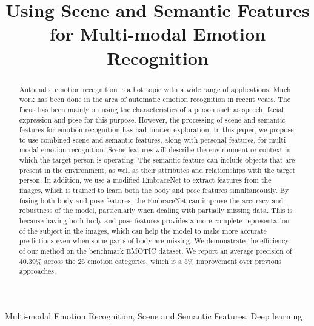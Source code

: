 \documentclass[conference]{IEEEtran}
\begin{document}
\title{Using Scene and Semantic Features for Multi-modal Emotion Recognition\\}

\author{
}
\maketitle

\begin{abstract}
Automatic emotion recognition is a hot topic with a wide range of applications. Much work has been done in the area of automatic emotion recognition in recent years. The focus has been mainly on using the characteristics of a person such as speech, facial expression and pose for this purpose. However, the processing of scene and semantic features for emotion recognition has had limited exploration. In this paper, we propose to use combined scene and semantic features, along with personal features, for multi-modal emotion recognition. Scene features will describe the environment or context in which the target person is operating. The semantic feature can include objects that are present in the environment, as well as their attributes and relationships with the target person. In addition, we use a modified EmbraceNet to extract features from the images, which is trained to learn both the body and pose features simultaneously. By fusing both body and pose features, the EmbraceNet can improve the accuracy and robustness of the model, particularly when dealing with partially missing data. This is because having both body and pose features provides a more complete representation of the subject in the images, which can help the model to make more accurate predictions even when some parts of body are missing. We demonstrate the efficiency of our method on the benchmark EMOTIC dataset. We report an average precision of 40.39\% across the 26 emotion categories, which is a 5\% improvement over previous approaches.
\end{abstract}

\begin{IEEEkeywords}
Multi-modal Emotion Recognition, Scene and Semantic Features, Deep learning
\end{IEEEkeywords}
\end{document}
